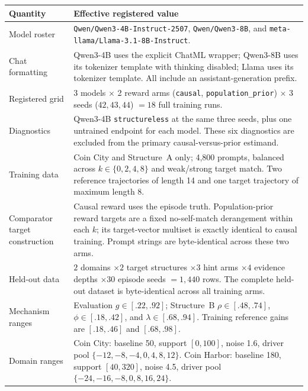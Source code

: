 \begin{center}
\begin{minipage}{\linewidth}
\centering
{}
\label{tab:exp3-coin-structural-hparams}
\scriptsize
\setlength{\tabcolsep}{3pt}
\begin{tabular}{p{.29\linewidth}p{.66\linewidth}}
\toprule
\textbf{Quantity} & \textbf{Effective registered value} \\
\midrule
Model roster & \texttt{Qwen/Qwen3-4B-Instruct-2507},
\texttt{Qwen/Qwen3-8B}, and
\texttt{meta-llama/Llama-3.1-8B-Instruct}. \\
Chat formatting & Qwen3-4B uses the explicit ChatML wrapper; Qwen3-8B uses its
tokenizer template with thinking disabled; Llama uses its tokenizer template.
All include an assistant-generation prefix. \\
Registered grid & 3 models $\times$ 2 reward arms
(\texttt{causal}, \texttt{population\_prior}) $\times$ 3 seeds
($42,43,44$) $=18$ full training runs. \\
Diagnostics & Qwen3-4B \texttt{structureless} at the same three seeds, plus one
untrained endpoint for each model. These six diagnostics are excluded from the primary
causal-versus-prior estimand. \\
Training data & Coin City and Structure~A only; 4,800 prompts, balanced across
$k\in\{0,2,4,8\}$ and weak/strong target match. Two reference trajectories of
length 14 and one target trajectory of maximum length 8. \\
Comparator target construction & Causal reward uses the episode truth.
Population-prior reward targets are a fixed no-self-match derangement within
each $k$; its target-vector multiset is exactly identical to causal training.
Prompt strings are byte-identical across these two arms. \\
Held-out data & $2$ domains $\times2$ target structures $\times3$ hint arms
$\times4$ evidence depths $\times30$ episode seeds $=1,440$ rows. The complete
held-out dataset is byte-identical across all training arms. \\
Mechanism ranges & Evaluation $g\in[.22,.92]$; Structure~B
$\rho\in[.48,.74]$, $\phi\in[.18,.42]$, and $\lambda\in[.68,.94]$.
Training reference gains are $[.18,.46]$ and $[.68,.98]$. \\
Domain ranges & Coin City: baseline 50, support $[0,100]$, noise 1.6, driver
pool $\{-12,-8,-4,0,4,8,12\}$. Coin Harbor: baseline 180, support $[40,320]$,
noise 4.5, driver pool $\{-24,-16,-8,0,8,16,24\}$. \\

\end{tabular}
\end{minipage}
\end{center}
